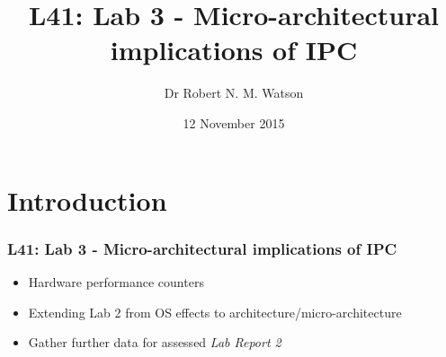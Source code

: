 
{
}

\usepackage[english]{babel}
\usepackage[latin1]{inputenc}
\usepackage{graphicx}
\usepackage{times}
\usepackage[T1]{fontenc}
\usepackage{fancyvrb}
\usepackage{hyperref}
\usepackage{listings}


\title{L41: Lab 3 - Micro-architectural implications of IPC}
\author{Dr Robert N. M. Watson}
\date{12 November 2015}

\begin{frame}
  \titlepage
\end{frame}

\section{Introduction}

\begin{frame}
  \frametitle{L41: Lab 3 - Micro-architectural implications of IPC}

  \begin{itemize}
    \item Hardware performance counters
    \item Extending Lab 2 from OS effects to architecture/micro-architecture
    \item Gather further data for assessed \textit{Lab Report 2}
  \end{itemize}
\end{frame}

